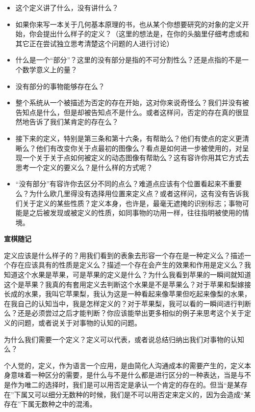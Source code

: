 \documentclass[
]{book}
\begin{document}
\begin{itemize}
\item
  这个定义讲了什么，没有讲什么？
\item
  如果你来写一本关于几何基本原理的书，也从某个你想要研究的对象的定义开始，你会提出什么样子的定义？（这里的想法是，在你的头脑里仔细考虑或和其它正在尝试独立思考清楚这个问题的人进行讨论）
\item
  什么是一个``部分''？这里的没有部分是指的不可分割性么？还是点指的不是一个数学意义上的量？
\item
  没有部分的事物能够存在么？
\item
  整个系统从一个被描述为否定的存在开始，这对你来说奇怪么？我们并没有被告知点是什么，但是却被告知点不是什么。或者这样问，否定的存在真的很显然地告诉了我们某肯定的存在么？
\item
  接下来的定义，特别是第三条和第十六条，有帮助么？他们有使点的定义更清晰么？他们有改变你关于点最初的图像么？看点是如何进一步被使用的，对呈现一个关于关于点如何被定义的动态图像有帮助么？这有容许你用其它方式去思考一个定义的要义么？是什么样的方式呢？
\item
  ``没有部分''有容许你去区分不同的点么？难道点应该有个位置看起来不重要么？为什么欧几里得没有选择用位置来定义点？或者这样问，这有没有告诉我们关于定义的某些性质？定义本身，也许是，最毫无遮掩的识别标志；事物可能是之后被发现或被定义的性质，如同事物的功用一样，往往指明被使用的情境。
\end{itemize}

\textbf{宣棋随记}

定义应该是什么样子的？用我们看到的表象去形容一个存在是一种定义么？描述一个存在应该具有的性质是定义么？描述一个存在会产生的效果和作用是定义么？我知道这个水果是苹果，可是苹果的定义是什么？为什么我看到苹果的一瞬间就知道这个是苹果？我真的有套用定义去判断这个水果是不是苹果么？对于苹果和梨嫁接长成的水果，我叫它苹果梨，我认为这是一种看起来像苹果但吃起来像梨的水果，在我自己的认知当中，我是怎样定义的？对于苹果梨，我可以看的一瞬间进行判断么？还是必须尝过之后才能判断？你应该能举出更多相似的例子来思考这个关于定义的问题，或者说关于对事物的认知的问题。

为什么我们需要一个定义？定义可以代表，或者说总结归纳出我们对事物的认知么？

个人觉的，定义，作为语言一个应用，是由简化人沟通成本的需要产生的，定义本身意味着一种区分的需要，是什么与不是什么都是进行区分的一种表达，当是与不是作为唯二的选择时，我们是可以用否定是承认一个肯定的存在的。但当``是某存在''下属又可以细分无数种的时候，我们是不可以用否定来定义的，因为会造成``某存在''下属无数种之中的混淆。
\end{document}
